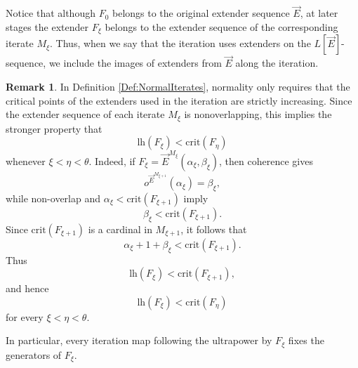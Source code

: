 \documentclass{article}
\theoremstyle{definition}
\newtheorem{remark}[definition]{Remark}
\theoremstyle{plain}
\begin{document}
Notice that although $F_0$ belongs to the original extender sequence $\vec E$, at later stages the extender $F_\xi$ belongs to the extender sequence of the corresponding iterate $M_\xi$. Thus, when we say that the iteration uses extenders on the $L[\vec E]$-sequence, we include the images of extenders from $\vec E$ along the iteration.

\begin{remark}
In Definition \ref{Def:NormalIterates}, normality only requires that the
critical points of the extenders used in the iteration are strictly
increasing. Since the extender sequence of each iterate $M_\xi$ is
nonoverlapping, this implies the stronger property that
$$\text{lh}(F_\xi)<\text{crit}(F_\eta)$$
whenever $\xi<\eta<\theta$. Indeed, if
$F_\xi=\vec E^{M_\xi}(\alpha_\xi,\beta_\xi)$, then coherence gives
$$o^{\vec E^{M_{\xi+1}}}(\alpha_\xi)=\beta_\xi,$$
while non-overlap and
$\alpha_\xi<\text{crit}(F_{\xi+1})$ imply
$$\beta_\xi<\text{crit}(F_{\xi+1}).$$
Since $\text{crit}(F_{\xi+1})$ is a cardinal in $M_{\xi+1}$, it follows that
$$\alpha_\xi+1+\beta_\xi<\text{crit}(F_{\xi+1}).$$
Thus
$$\text{lh}(F_\xi)<\text{crit}(F_{\xi+1}),$$
and hence
$$\text{lh}(F_\xi)<\text{crit}(F_\eta)$$
for every $\xi<\eta<\theta$.

In particular, every iteration map following the ultrapower by $F_\xi$ fixes the generators of $F_\xi$.
\end{remark}
\end{document}
